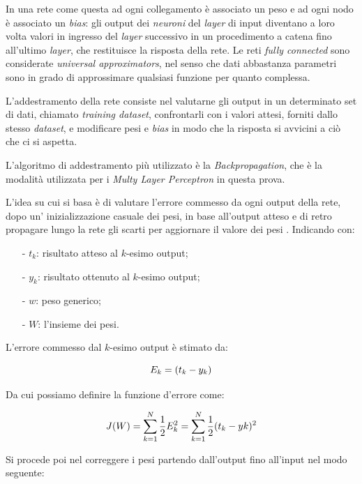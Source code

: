 \documentclass[12pt,a4paper]{report}
\begin{document}
In una rete come questa ad ogni collegamento è associato un peso e ad ogni nodo è associato un \textit{bias}: gli output dei \textit{neuroni} del \textit{layer} di input diventano a loro volta valori in ingresso del \textit{layer} successivo in un procedimento a catena fino all'ultimo \textit{layer}, che restituisce la risposta della rete. 
Le reti \textit{fully connected} sono considerate \textit{universal approximators}, nel senso che dati abbastanza parametri sono in grado di approssimare qualsiasi funzione per quanto complessa.\cite{neural-net-nielsen}

L'addestramento della rete consiste nel valutarne gli output in un determinato set di dati, chiamato \textit{training dataset}, confrontarli con i valori attesi, forniti dallo stesso \textit{dataset}, e modificare pesi e \textit{bias} in modo che la risposta si avvicini a ciò che ci si aspetta.

L'algoritmo di addestramento più utilizzato è la \textit{Backpropagation}, che è la modalità utilizzata per i \textit{Multy Layer Perceptron} in questa prova.

L'idea su cui si basa è di valutare l'errore commesso da ogni output della rete, dopo un' inizializzazione casuale dei pesi, in base all'output atteso e di retro propagare lungo la rete gli scarti per aggiornare il valore dei pesi \cite{backprop}.
Indicando con:

\begin{enumerate}
 \item[-] $t_{k}$: risultato atteso al $k$-esimo output;
 \item[-] $y_{k}$: risultato ottenuto al $k$-esimo output;
 \item[-] $w$: peso generico;
 \item[-] $W$: l'insieme dei pesi.
\end{enumerate}

L'errore commesso dal $k$-esimo output è stimato da:

\begin{equation}
 \centering
 E_{k} = (t_{k}-y_{k})
\end{equation}

Da cui possiamo definire la funzione d'errore come:

\begin{equation}
 \centering
 J(W) = \sum_{k = 1}^{N}\frac{1}{2}E_{k}^2 = \sum_{k = 1}^{N}\frac{1}{2}(t_{k}-y{k})^2
\end{equation}

Si procede poi nel correggere i pesi partendo dall'output fino all'input nel modo seguente:
\end{document}
